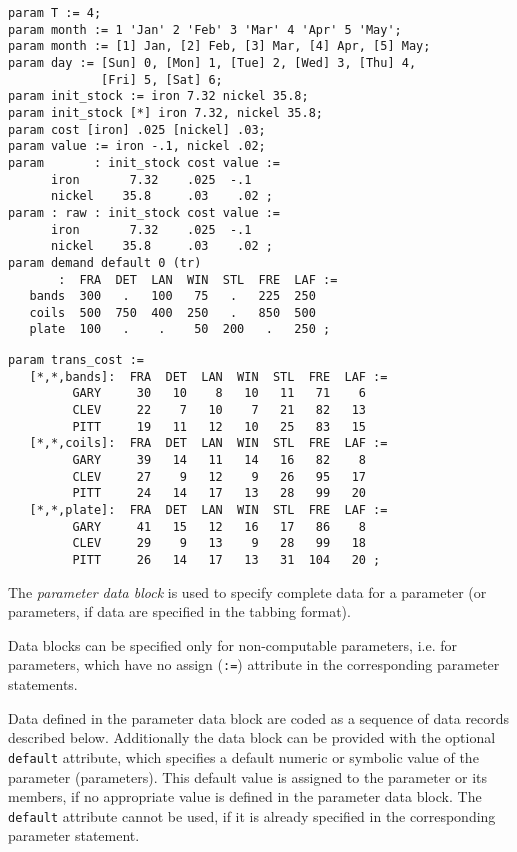 \documentclass[10pt]{article}
\begin{document}
\begin{verbatim}
param T := 4;
param month := 1 'Jan' 2 'Feb' 3 'Mar' 4 'Apr' 5 'May';
param month := [1] Jan, [2] Feb, [3] Mar, [4] Apr, [5] May;
param day := [Sun] 0, [Mon] 1, [Tue] 2, [Wed] 3, [Thu] 4,
             [Fri] 5, [Sat] 6;
param init_stock := iron 7.32 nickel 35.8;
param init_stock [*] iron 7.32, nickel 35.8;
param cost [iron] .025 [nickel] .03;
param value := iron -.1, nickel .02;
param       : init_stock cost value :=
      iron       7.32    .025  -.1
      nickel    35.8     .03    .02 ;
param : raw : init_stock cost value :=
      iron       7.32    .025  -.1
      nickel    35.8     .03    .02 ;
param demand default 0 (tr)
       :  FRA  DET  LAN  WIN  STL  FRE  LAF :=
   bands  300   .   100   75   .   225  250
   coils  500  750  400  250   .   850  500
   plate  100   .    .    50  200   .   250 ;
\end{verbatim}

\newpage

\begin{verbatim}
param trans_cost :=
   [*,*,bands]:  FRA  DET  LAN  WIN  STL  FRE  LAF :=
         GARY     30   10    8   10   11   71    6
         CLEV     22    7   10    7   21   82   13
         PITT     19   11   12   10   25   83   15
   [*,*,coils]:  FRA  DET  LAN  WIN  STL  FRE  LAF :=
         GARY     39   14   11   14   16   82    8
         CLEV     27    9   12    9   26   95   17
         PITT     24   14   17   13   28   99   20
   [*,*,plate]:  FRA  DET  LAN  WIN  STL  FRE  LAF :=
         GARY     41   15   12   16   17   86    8
         CLEV     29    9   13    9   28   99   18
         PITT     26   14   17   13   31  104   20 ;
\end{verbatim}

The {\it parameter data block} is used to specify complete data for a
parameter (or parameters, if data are specified in the tabbing format).

Data blocks can be specified only for non-computable parameters, i.e.
for parameters, which have no assign ({\tt:=}) attribute in the
corresponding parameter statements.

Data defined in the parameter data block are coded as a sequence of
data records described below. Additionally the data block can be
provided with the optional {\tt default} attribute, which specifies a
default numeric or symbolic value of the parameter (parameters). This
default value is assigned to the parameter or its members, if
no appropriate value is defined in the parameter data block. The
{\tt default} attribute cannot be used, if it is already specified in
the corresponding parameter statement.
\end{document}
